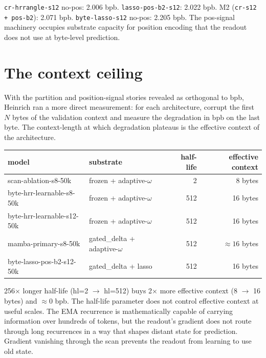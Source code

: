 \begin{result}
\texttt{cr-hrrangle-s12} no-pos: 2.006 bpb. \texttt{lasso-pos-b2-s12}: 2.022 bpb. M2 (\texttt{cr-s12 + pos-b2}): 2.071 bpb. \texttt{byte-lasso-s12} no-pos: 2.205 bpb. The pos-signal machinery occupies substrate capacity for position encoding that the readout does not use at byte-level prediction.
\end{result}

\section{The context ceiling}

With the partition and position-signal stories revealed as orthogonal to bpb, Heinrich ran a more direct measurement: for each architecture, corrupt the first $N$ bytes of the validation context and measure the degradation in bpb on the last byte. The context-length at which degradation plateaus is the effective context of the architecture.

\begin{center}
\begin{tabular}{llrr}
\toprule
model & substrate & half-life & effective context \\
\midrule
scan-ablation-s8-50k      & frozen + adaptive-$\omega$ & 2   & 8 bytes \\
byte-hrr-learnable-s8-50k & frozen + adaptive-$\omega$ & 512 & 16 bytes \\
byte-hrr-learnable-s12-50k & frozen + adaptive-$\omega$ & 512 & 16 bytes \\
mamba-primary-s8-50k      & gated\_delta + adaptive-$\omega$ & 512 & $\approx 16$ bytes \\
byte-lasso-pos-b2-s12-50k & gated\_delta + lasso & 512 & 16 bytes \\
\bottomrule
\end{tabular}
\end{center}

\begin{result}
256$\times$ longer half-life (hl=2 $\to$ hl=512) buys 2$\times$ more effective context (8 $\to$ 16 bytes) and $\approx 0$ bpb. The half-life parameter does not control effective context at useful scales. The EMA recurrence is mathematically capable of carrying information over hundreds of tokens, but the readout's gradient does not route through long recurrences in a way that shapes distant state for prediction. Gradient vanishing through the scan prevents the readout from learning to use old state.
\end{result}

